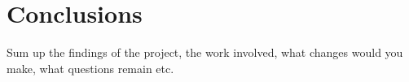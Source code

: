 \chapter{Conclusions}
Sum up the findings of the project, the work involved, what changes would you make, what questions remain etc.
